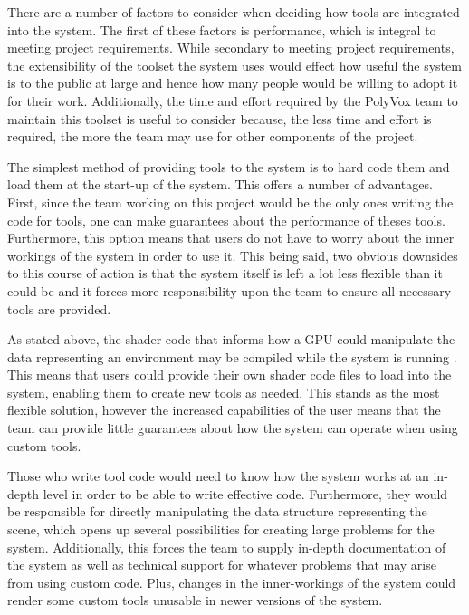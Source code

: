 \documentclass[onecolumn, draftclsnofoot,10pt, compsoc]{IEEEtran}
\newcounter{threesection}[subsubsection]
\begin{document}

There are a number of factors to consider when deciding how tools are integrated into the system.
The first of these factors is performance, which is integral to meeting project requirements.
While secondary to meeting project requirements, the extensibility of the toolset the system uses would effect how useful the system is to the public at large and hence how many people would be willing to adopt it for their work.
Additionally, the time and effort required by the PolyVox team to maintain this toolset is useful to consider because, the less time and effort is required, the more the team may use for other components of the project.



The simplest method of providing tools to the system is to hard code them and load them at the start-up of the system.
This offers a number of advantages.
First, since the team working on this project would be the only ones writing the code for tools, one can make guarantees about the performance of theses tools.
Furthermore, this option means that users do not have to worry about the inner workings of the system in order to use it.
This being said, two obvious downsides to this course of action is that the system itself is left a lot less flexible than it could be and it forces more responsibility upon the team to ensure all necessary tools are provided.



As stated above, the shader code that informs how a GPU could manipulate the data representing an environment may be compiled while the system is running \cite{braxTech4}.
This means that users could provide their own shader code files to load into the system, enabling them to create new tools as needed.
This stands as the most flexible solution, however the increased capabilities of the user means that the team can provide little guarantees about how the system can operate when using custom tools.

Those who write tool code would need to know how the system works at an in-depth level in order to be able to write effective code.
Furthermore, they would be responsible for directly manipulating the data structure representing the scene, which opens up several possibilities for creating large problems for the system.
Additionally, this forces the team to supply in-depth documentation of the system as well as technical support for whatever problems that may arise from using custom code.
Plus, changes in the inner-workings of the system could render some custom tools unusable in newer versions of the system.
\end{document}
